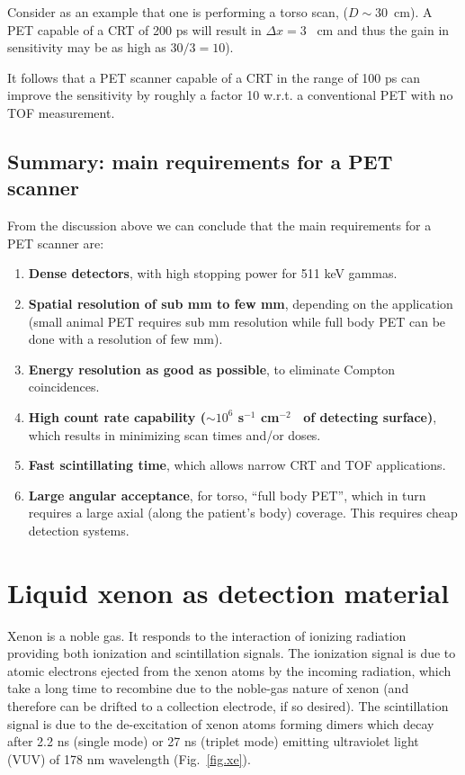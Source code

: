 \documentclass[review]{elsarticle}
\begin{document}
Consider as an example that one is performing a torso scan, ($D \sim 30$~cm). A PET capable of a CRT of 200 ps will result in $\Delta x = 3$~ cm and thus the gain in sensitivity may be as high as $30/3 = 10$). 
  
It follows that a PET scanner capable of a CRT in the range of 100 ps can improve the sensitivity by roughly a factor 10 w.r.t. a conventional PET with no TOF measurement. 


\subsection*{Summary: main requirements for a PET scanner}

From the discussion above we can conclude that the 
main requirements for a PET scanner are: 

\begin{enumerate}
\item {\bf Dense detectors}, with high stopping power for 511 keV gammas.
\item {\bf Spatial resolution of sub mm to few mm}, depending on the application (small animal PET requires sub mm resolution while full body PET can be done with a resolution of few mm).
\item {\bf Energy resolution as good as possible}, to eliminate Compton coincidences.
\item {\bf High count rate capability ($\sim10^6$ s$^{-1}$ cm$^{-2}$~ of detecting surface)}, which results in minimizing scan times and/or doses.
\item {\bf Fast scintillating time}, which allows narrow CRT and TOF applications. 
\item {\bf Large angular acceptance}, for torso, ``full body PET'', which in turn requires a large axial (along the patient's body) coverage. This requires cheap detection systems. 
\end{enumerate}


\section{Liquid xenon as detection material}

%

Xenon is a noble gas. It responds to the interaction of ionizing radiation providing both ionization and scintillation signals. The ionization signal is due to atomic electrons ejected from the xenon atoms by the incoming radiation, which take a long time to recombine due to the noble-gas nature of xenon (and therefore can be drifted to a collection electrode, if so desired). The scintillation signal is due to the de-excitation of xenon atoms forming dimers which decay after 2.2 ns (single mode) or 27 ns (triplet mode) emitting ultraviolet light (VUV) of 178 nm wavelength (Fig.~\ref{fig.xe}).
\end{document}
